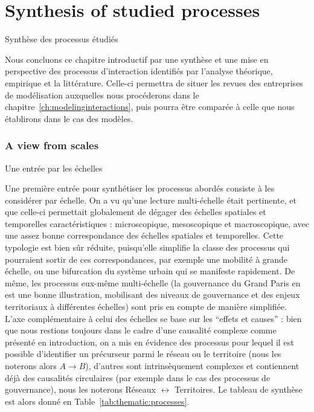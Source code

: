 


\newpage

\section*{Synthesis of studied processes}{Synthèse des processus étudiés}



Nous concluons ce chapitre introductif par une synthèse et une mise en perspective des processus d'interaction identifiés par l'analyse théorique, empirique et la littérature. Celle-ci permettra de situer les revues des entreprises de modélisation auxquelles nous procéderons dans le chapitre~\ref{ch:modelinginteractions}, puis pourra être comparée à celle que nous établirons dans le cas des modèles.


\subsubsection*{A view from scales}{Une entrée par les échelles}

Une première entrée pour synthétiser les processus abordés consiste à les considérer par échelle. On a vu qu'une lecture multi-échelle était pertinente, et que celle-ci permettait globalement de dégager des échelles spatiales et temporelles caractéristiques : microscopique, mesoscopique et macroscopique, avec une assez bonne correspondance des échelles spatiales et temporelles. Cette typologie est bien sûr réduite, puisqu'elle simplifie la classe des processus qui pourraient sortir de ces correspondances, par exemple une mobilité à grande échelle, ou une bifurcation du système urbain qui se manifeste rapidement. De même, les processus eux-même multi-échelle (la gouvernance du Grand Paris en est une bonne illustration, mobilisant des niveaux de gouvernance et des enjeux territoriaux à différentes échelles) sont pris en compte de manière simplifiée. L'axe complémentaire à celui des échelles se base sur les ``effets et causes'' : bien que nous restions toujours dans le cadre d'une causalité complexe comme présenté en introduction, on a mis en évidence des processus pour lequel il est possible d'identifier un précurseur parmi le réseau ou le territoire (nous les noterons alors $A \rightarrow B$), d'autres sont intrinsèquement complexes et contiennent déjà des causalités circulaires (par exemple dans le cas des processus de gouvernance), nous les noterons Réseaux $\leftrightarrow$ Territoires. Le tableau de synthèse est alors donné en Table~\ref{tab:thematic:processes}.


